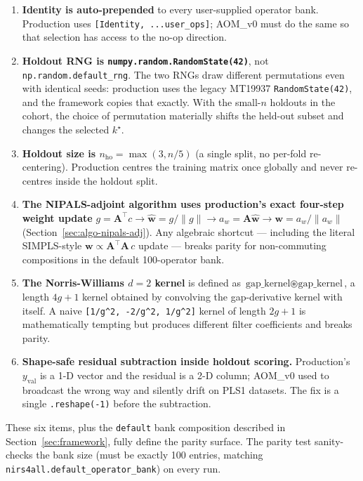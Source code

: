 \documentclass[review,a4paper]{elsarticle}
\newcommand{\Amat}{\mathbf{A}}
\newcommand{\wvec}{\mathbf{w}}
\newcommand{\AOM}{\textsc{AOM}\xspace}
\newcommand{\NIPALS}{\textsc{NIPALS}\xspace}
\newcommand{\SIMPLS}{\textsc{SIMPLS}\xspace}
\begin{document}
\begin{enumerate}[leftmargin=2em]
  \item \textbf{Identity is auto-prepended} to every user-supplied
        operator bank. Production uses
        \verb|[Identity, ...user_ops]|; \AOM\_v0 must do the same so
        that selection has access to the no-op direction.
  \item \textbf{Holdout RNG is \texttt{numpy.random.RandomState(42)}},
        not \verb|np.random.default_rng|. The two RNGs draw different
        permutations even with identical seeds: production uses the
        legacy MT19937 \verb|RandomState(42)|, and the framework copies
        that exactly. With the small-$n$ holdouts in the cohort, the
        choice of permutation materially shifts the held-out subset
        and changes the selected $k^\star$.
  \item \textbf{Holdout size is $n_\text{ho}=\max(3, n/5)$} (a single
        split, no per-fold re-centering). Production centres the
        training matrix once globally and never re-centres inside the
        holdout split.
  \item \textbf{The \NIPALS-adjoint algorithm uses production's exact
        four-step weight update}
        $g=\Amat^\top c \to \hat{\wvec}=g/\|g\| \to a_w=\Amat\hat{\wvec}
        \to \wvec=a_w/\|a_w\|$ (Section~\ref{sec:algo-nipals-adj}).
        Any algebraic shortcut --- including the literal \SIMPLS-style
        $\wvec\propto\Amat^\top\Amat\,c$ update --- breaks parity for
        non-commuting compositions in the default 100-operator bank.
  \item \textbf{The Norris-Williams $d{=}2$ kernel} is defined as
        $\text{gap\_kernel}\circledast\text{gap\_kernel}$, a length
        $4g{+}1$ kernel obtained by convolving the gap-derivative
        kernel with itself. A naive \texttt{[1/g\^{}2,\,-2/g\^{}2,\,1/g\^{}2]}
        kernel of length $2g{+}1$ is mathematically tempting but
        produces different filter coefficients and breaks parity.
  \item \textbf{Shape-safe residual subtraction inside holdout
        scoring.} Production's $y_\text{val}$ is a 1-D vector and the
        residual is a 2-D column; \AOM\_v0 used to broadcast the
        wrong way and silently drift on PLS1 datasets. The fix is a
        single \verb|.reshape(-1)| before the subtraction.
\end{enumerate}

These six items, plus the \texttt{default} bank composition described
in Section~\ref{sec:framework}, fully define the parity surface. The
parity test sanity-checks the bank size (must be exactly 100 entries,
matching \verb|nirs4all.default_operator_bank|) on every run.
\end{document}
